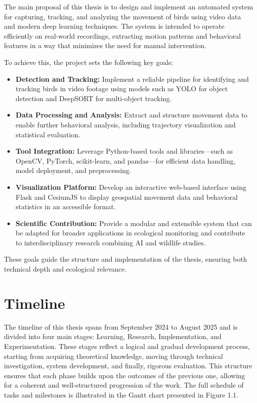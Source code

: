 The main proposal of this thesis is to design and implement an automated system for capturing, tracking, and analyzing the movement of birds using video data and modern deep learning techniques. The system is intended to operate efficiently on real-world recordings, extracting motion patterns and behavioral features in a way that minimizes the need for manual intervention.

To achieve this, the project sets the following key goals:

\begin{itemize}
    \item \textbf{Detection and Tracking:} Implement a reliable pipeline for identifying and tracking birds in video footage using models such as YOLO for object detection and DeepSORT for multi-object tracking.
    \item \textbf{Data Processing and Analysis:} Extract and structure movement data to enable further behavioral analysis, including trajectory visualization and statistical evaluation.
    \item \textbf{Tool Integration:} Leverage Python-based tools and libraries---such as OpenCV, PyTorch, scikit-learn, and pandas---for efficient data handling, model deployment, and preprocessing.
    \item \textbf{Visualization Platform:} Develop an interactive web-based interface using Flask and CesiumJS to display geospatial movement data and behavioral statistics in an accessible format.
    \item \textbf{Scientific Contribution:} Provide a modular and extensible system that can be adapted for broader applications in ecological monitoring and contribute to interdisciplinary research combining AI and wildlife studies.
\end{itemize}

These goals guide the structure and implementation of the thesis, ensuring both technical depth and ecological relevance.


\section{Timeline}

The timeline of this thesis spans from September 2024 to August 2025 and is divided into four main stages: Learning, Research, Implementation, and Experimentation. These stages reflect a logical and gradual development process, starting from acquiring theoretical knowledge, moving through technical investigation, system development, and finally, rigorous evaluation. This structure ensures that each phase builds upon the outcomes of the previous one, allowing for a coherent and well-structured progression of the work. The full schedule of tasks and milestones is illustrated in the Gantt chart presented in Figure 1.1.

